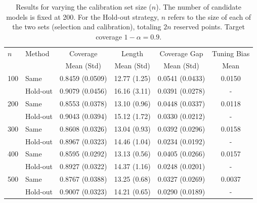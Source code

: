 \documentclass{article}
\newcommand{\1}{\mathbbm{1}}
\theoremstyle{plain}
\theoremstyle{definition}
\theoremstyle{remark}
\begin{document}
\begin{table}[htbp]
\centering
\caption{Results for varying the calibration set size ($n$). The number of candidate models is fixed at 200. For the Hold-out strategy, $n$ refers to the size of each of the two sets (selection and calibration), totaling $2n$ reserved points. Target coverage $1-\alpha=0.9$.}
\label{tab:exp2_cal_size_revised_with_tuning_bias}
\begin{tabular}{@{}llcccc@{}}
\toprule
$n$ & Method    & Coverage        & Length          & Coverage Gap    & Tuning Bias \\
    &           & Mean (Std)      & Mean (Std)      & Mean (Std)      & Mean        \\
\midrule
100   & Same      & 0.8459 (0.0509) & 12.77 (1.25)    & 0.0541 (0.0433) & 0.0150      \\
      & Hold-out  & 0.9079 (0.0456) & 16.16 (3.11)    & 0.0391 (0.0278) & -           \\
\midrule
200   & Same      & 0.8553 (0.0378) & 13.10 (0.96)    & 0.0448 (0.0337) & 0.0118      \\
      & Hold-out  & 0.9043 (0.0394) & 15.12 (1.72)    & 0.0330 (0.0212) & -           \\
\midrule
300   & Same      & 0.8608 (0.0326) & 13.04 (0.93)    & 0.0392 (0.0296) & 0.0158      \\
      & Hold-out  & 0.8967 (0.0323) & 14.46 (1.04)    & 0.0234 (0.0192) & -           \\
\midrule
400   & Same      & 0.8595 (0.0292) & 13.13 (0.56)    & 0.0405 (0.0266) & 0.0157      \\
      & Hold-out  & 0.8927 (0.0322) & 14.37 (1.16)    & 0.0248 (0.0201) & -           \\
\midrule
500   & Same      & 0.8767 (0.0388) & 13.25 (0.68)    & 0.0327 (0.0269) & 0.0037      \\
      & Hold-out  & 0.9007 (0.0323) & 14.21 (0.65)    & 0.0290 (0.0189) & -           \\
\bottomrule
\end{tabular}
\end{table}
\end{document}
